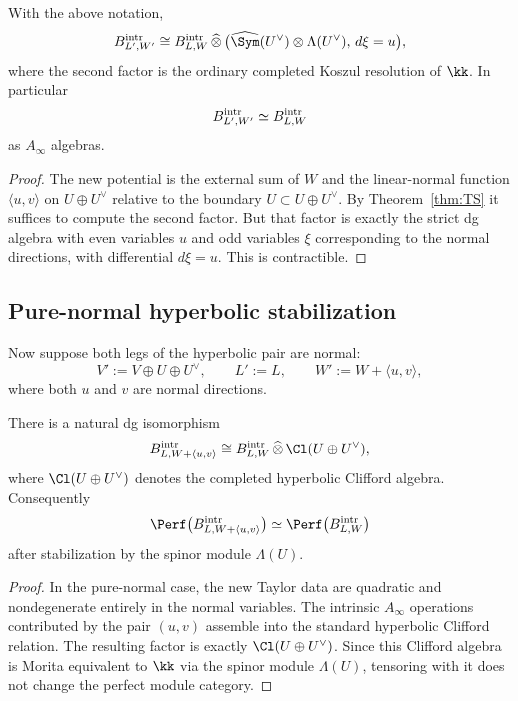 \begin{theorem}\label{thm:contractible-stab}
With the above notation,
\[
B^\intr_{L',W'}
\cong
B^\intr_{L,W}\,\widehat{\otimes}\,
\bigl(\widehat{\Sym}(U^\vee)\ot \Lambda(U^\vee),\, d\xi=u\bigr),
\]
where the second factor is the ordinary completed Koszul resolution of $\kk$. In particular
\[
B^{\mathrm{intr}}_{L',W'}\simeq B^{\mathrm{intr}}_{L,W}
\]
as $A_\infty$ algebras.
\end{theorem}

\begin{proof}
The new potential is the external sum of $W$ and the linear-normal function $\langle u,v\rangle$ on $U\oplus U^\vee$ relative to the boundary $U\subset U\oplus U^\vee$. By Theorem~\ref{thm:TS} it suffices to compute the second factor. But that factor is exactly the strict dg algebra with even variables $u$ and odd variables $\xi$ corresponding to the normal directions, with differential $d\xi=u$. This is contractible.
\end{proof}

\subsection{Pure-normal hyperbolic stabilization}

Now suppose both legs of the hyperbolic pair are normal:
\[
V' := V\oplus U\oplus U^\vee,
\qquad
L' := L,
\qquad
W' := W+\langle u,v\rangle,
\]
where both $u$ and $v$ are normal directions.

\begin{theorem}\label{thm:clifford-stab}
There is a natural dg isomorphism
\[
B^\intr_{L,W+\langle u,v\rangle}
\cong
B^\intr_{L,W}\,\widehat{\otimes}\, \Cl(U\oplus U^\vee),
\]
where $\Cl(U\oplus U^\vee)$ denotes the completed hyperbolic Clifford algebra. Consequently
\[
\Perf\bigl(B^\intr_{L,W+\langle u,v\rangle}\bigr)
\simeq
\Perf\bigl(B^\intr_{L,W}\bigr)
\]
after stabilization by the spinor module $\Lambda(U)$.
\end{theorem}

\begin{proof}
In the pure-normal case, the new Taylor data are quadratic and nondegenerate entirely in the normal variables. The intrinsic $A_\infty$ operations contributed by the pair $(u,v)$ assemble into the standard hyperbolic Clifford relation. The resulting factor is exactly $\Cl(U\oplus U^\vee)$. Since this Clifford algebra is Morita equivalent to $\kk$ via the spinor module $\Lambda(U)$, tensoring with it does not change the perfect module category.
\end{proof}

